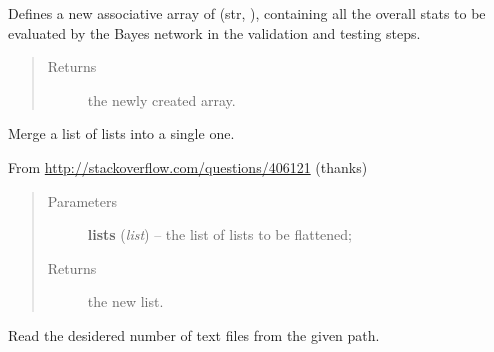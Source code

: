 \documentclass[letterpaper,10pt,english]{sphinxmanual}
\begin{document}
\begin{fulllineitems}
\begin{fulllineitems}
\begin{quote}
\begin{description}
\end{description}\end{quote}

\end{fulllineitems}


\begin{fulllineitems}
\label{index:utils.Utils.create_test_stats}
Defines a new associative array of (str, {\hyperref[index:test_stat.Test_stat]{}}),
containing all the overall stats to be evaluated by the Bayes network
in the validation and testing steps.
\begin{quote}\begin{description}
\item[{Returns}] \leavevmode
the newly created array.

\end{description}\end{quote}

\end{fulllineitems}


\begin{fulllineitems}
\label{index:utils.Utils.merge_lists}
Merge a list of lists into a single one.

From \href{http://stackoverflow.com/questions/406121}{http://stackoverflow.com/questions/406121} (thanks)
\begin{quote}\begin{description}
\item[{Parameters}] \leavevmode
\textbf{lists} (\emph{list}) -- the list of lists to be flattened;

\item[{Returns}] \leavevmode
the new list.

\end{description}\end{quote}

\end{fulllineitems}


\begin{fulllineitems}
\label{index:utils.Utils.read_mails}
Read the desidered number of text files from the given path.


\end{fulllineitems}
\end{fulllineitems}
\end{document}
